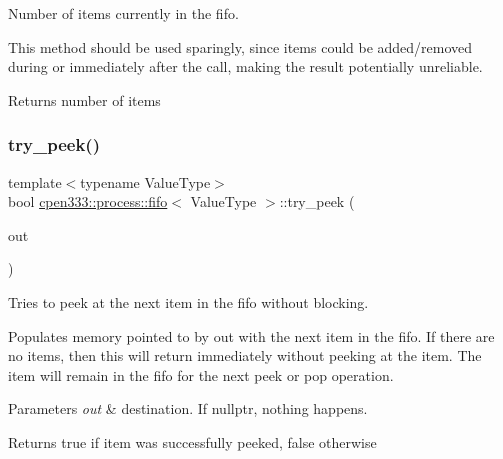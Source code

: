 Number of items currently in the fifo. 

This method should be used sparingly, since items could be added/removed during or immediately after the call, making the result potentially unreliable.

\begin{DoxyReturn}{Returns}
number of items 
\end{DoxyReturn}
\mbox{\label{classcpen333_1_1process_1_1fifo_a0518230659a2ec8568f05377f4e2e727}} 
\subsubsection{\texorpdfstring{try\+\_\+peek()}{try\_peek()}}
{\footnotesize\ttfamily template$<$typename Value\+Type$>$ \\
bool \hyperlink{classcpen333_1_1process_1_1fifo}{cpen333\+::process\+::fifo}$<$ Value\+Type $>$\+::try\+\_\+peek (\begin{DoxyParamCaption}\item[{Value\+Type $\ast$}]{out }\end{DoxyParamCaption})\hspace{0.3cm}{\ttfamily [inline]}}



Tries to peek at the next item in the fifo without blocking. 

Populates memory pointed to by {\ttfamily out} with the next item in the fifo. If there are no items, then this will return immediately without peeking at the item. The item will remain in the fifo for the next {\ttfamily peek} or {\ttfamily pop} operation.


\begin{DoxyParams}{Parameters}
{\em out} & destination. If {\ttfamily nullptr}, nothing happens. \\
\hline
\end{DoxyParams}
\begin{DoxyReturn}{Returns}
{\ttfamily true} if item was successfully peeked, {\ttfamily false} otherwise 
\end{DoxyReturn}
\mbox{\label{classcpen333_1_1process_1_1fifo_a61d351911485a6cef80404da4aa663ec}} 
